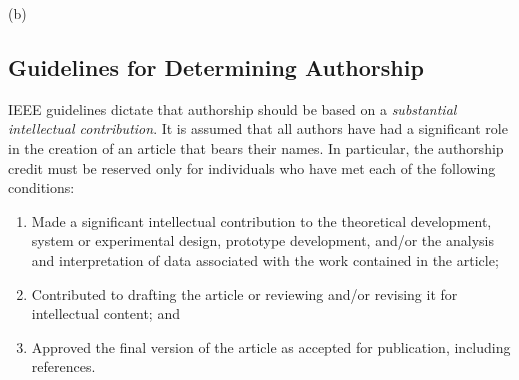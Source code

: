 \documentclass[conference]{IEEEtran}
\begin{document}
(b)


\subsection{Guidelines for Determining Authorship}
IEEE guidelines dictate that authorship should be based on a {\em
  substantial intellectual contribution}. It is assumed that all
authors have had a significant role in the creation of an article that
bears their names. In particular, the authorship credit must be
reserved only for individuals who have met each of the following
conditions:

\begin{enumerate}
\item Made a significant intellectual contribution to the theoretical
  development, system or experimental design, prototype development,
  and/or the analysis and interpretation of data associated with the
  work contained in the article;

\item Contributed to drafting the article or reviewing and/or revising
  it for intellectual content; and

\item Approved the final version of the article as accepted for publication, including references.
\end{enumerate}








\end{document}
